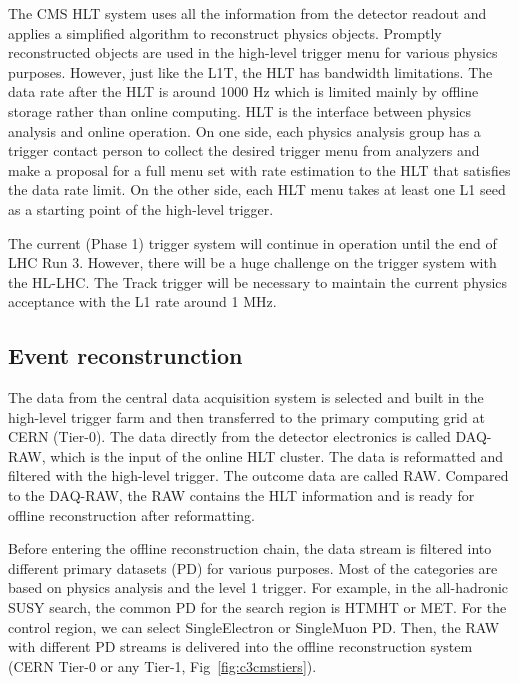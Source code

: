 The CMS HLT system uses all the information from the detector readout and applies a simplified algorithm to reconstruct physics objects. Promptly reconstructed objects are used in the high-level trigger menu for various physics purposes. However, just like the L1T, the HLT has bandwidth limitations. The data rate after the HLT is around 1000 Hz which is limited mainly by offline storage rather than online computing. HLT is the interface between physics analysis and online operation. On one side, each physics analysis group has a trigger contact person to collect the desired trigger menu from analyzers and make a proposal for a full menu set with rate estimation to the HLT that satisfies the data rate limit. On the other side, each HLT menu takes at least one L1 seed as a starting point of the high-level trigger.

The current (Phase 1) trigger system will continue in operation until the end of LHC Run 3. However, there will be a huge challenge on the trigger system with the HL-LHC. The Track trigger will be necessary to maintain the current physics acceptance with the L1 rate around 1 MHz. 

\clearpage
\subsection{Event reconstrunction}

The data from the central data acquisition system is selected and built in the high-level trigger farm and then transferred to the primary computing grid at CERN (Tier-0). The data directly from the detector electronics is called DAQ-RAW, which is the input of the online HLT cluster. The data is reformatted and filtered with the high-level trigger. The outcome data are called RAW. Compared to the DAQ-RAW, the RAW contains the HLT information and is ready for offline reconstruction after reformatting. 

Before entering the offline reconstruction chain, the data stream is filtered into different primary datasets (PD) for various purposes. Most of the categories are based on physics analysis and the level 1 trigger. For example, in the all-hadronic SUSY search, the common PD for the search region is HTMHT or MET. For the control region, we can select SingleElectron or SingleMuon PD. Then, the RAW with different PD streams is delivered into the offline reconstruction system (CERN Tier-0 or any Tier-1, Fig~\ref{fig:c3cmstiers}). 

